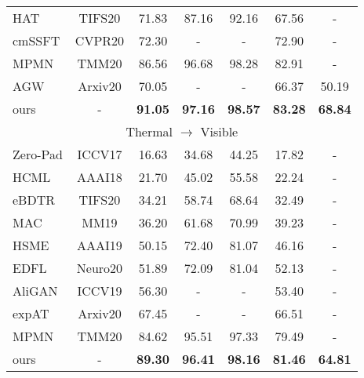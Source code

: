 \documentclass[journal]{IEEEtran}
\begin{document}
\begin{table}
\begin{tabular}{l|c|c|c|c|c|c}
      HAT \cite{ye2018vipr} & TIFS20 & 71.83 & 87.16 & 92.16 & 67.56 & - \\
      cmSSFT \cite{lu2020cross} & CVPR20 & 72.30 & - & - & 72.90 &-  \\
      MPMN \cite{Wang2020MPMN} & TMM20 & 86.56 & 96.68 & 98.28 & 82.91 & - \\
      AGW \cite{Ye2020DeepLF} & Arxiv20 & 70.05 & - & - & 66.37 & 50.19  \\ \hline
      ours & - & \textbf{91.05}  & \textbf{97.16} & \textbf{98.57} & \textbf{83.28} & \textbf{68.84} \\ \toprule[1pt] \toprule[1pt]
      \multicolumn{7}{c}{ Thermal $\rightarrow$ Visible} \\ \toprule[1pt]
      Zero-Pad \cite{wu2017rgb}& ICCV17 & 16.63 & 34.68 & 44.25 & 17.82 & - \\
      HCML\cite{ye2018hierarchical} & AAAI18 & 21.70 & 45.02 & 55.58 & 22.24 & -\\
      eBDTR \cite{Ye2020DeepLF} & TIFS20 & 34.21 & 58.74 & 68.64 & 32.49 & - \\
      MAC \cite{Ye2019ModalityawareCL} & MM19 & 36.20 & 61.68 & 70.99 & 39.23 & - \\
      HSME \cite{hao2019hsme} & AAAI19  & 50.15 & 72.40 & 81.07 & 46.16 & - \\
      EDFL \cite{liu2020enhancing} & Neuro20 & 51.89 & 72.09 & 81.04 & 52.13 & - \\
      AliGAN \cite{wang2019rgb} & ICCV19 & 56.30 & - & - & 53.40 & - \\
      expAT \cite{Ye2020BidirectionalEA} & Arxiv20 & 67.45 & - & - & 66.51 & - \\
      MPMN \cite{Wang2020MPMN} & TMM20 & 84.62 & 95.51 & 97.33 & 79.49 & - \\ \hline
      ours & - & \textbf{89.30}  & \textbf{96.41} & \textbf{98.16} & \textbf{81.46} & \textbf{64.81} \\
      \toprule[2pt]
  \end{tabular}
\end{table}
\end{document}
